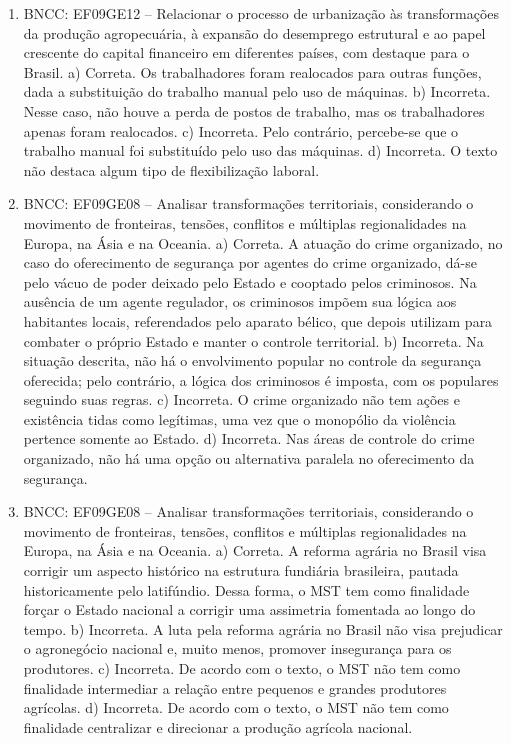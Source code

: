 \begin{enumerate}
\item
BNCC: EF09GE12 -- Relacionar o processo de urbanização às transformações
da produção agropecuária, à expansão do desemprego estrutural e ao papel
crescente do capital financeiro em diferentes países, com destaque para
o Brasil.
a) Correta. Os trabalhadores foram realocados para outras
funções, dada a substituição do trabalho manual pelo uso de máquinas.
b) Incorreta. Nesse caso, não houve a perda de postos de trabalho, mas os
trabalhadores apenas foram realocados.
c) Incorreta. Pelo contrário, percebe-se que o trabalho manual foi
substituído pelo uso das máquinas.
d) Incorreta. O texto não destaca algum tipo de flexibilização
laboral.

\item
BNCC: EF09GE08 -- Analisar transformações territoriais, considerando o movimento de fronteiras,
tensões, conflitos e múltiplas regionalidades na Europa, na Ásia e na Oceania.
a) Correta. A atuação do crime organizado, no caso do oferecimento de
segurança por agentes do crime organizado, dá-se pelo vácuo de poder
deixado pelo Estado e cooptado pelos criminosos. Na ausência de um
agente regulador, os criminosos impõem sua lógica aos habitantes locais,
referendados pelo aparato bélico, que depois utilizam para combater o
próprio Estado e manter o controle territorial.
b) Incorreta. Na situação descrita, não há o envolvimento popular no
controle da segurança oferecida; pelo contrário, a lógica dos criminosos
é imposta, com os populares seguindo suas regras.
c) Incorreta. O crime organizado não tem ações e existência tidas
como legítimas, uma vez que o monopólio da violência pertence somente ao
Estado.
d) Incorreta. Nas áreas de controle do crime organizado, não há uma
opção ou alternativa paralela no oferecimento da segurança.

\item
BNCC: EF09GE08 -- Analisar transformações territoriais, considerando o movimento de fronteiras,
tensões, conflitos e múltiplas regionalidades na Europa, na Ásia e na Oceania.
a) Correta. A reforma agrária no Brasil visa corrigir um aspecto
histórico na estrutura fundiária brasileira, pautada historicamente pelo
latifúndio. Dessa forma, o MST tem como finalidade forçar o Estado
nacional a corrigir uma assimetria fomentada ao longo do tempo.
b) Incorreta. A luta pela reforma agrária no Brasil não visa prejudicar
o agronegócio nacional e, muito menos, promover insegurança
para os produtores.
c) Incorreta. De acordo com o texto, o MST não tem como finalidade
intermediar a relação entre pequenos e grandes produtores agrícolas.
d) Incorreta. De acordo com o texto, o MST não tem como finalidade
centralizar e direcionar a produção agrícola nacional.


\end{enumerate}

